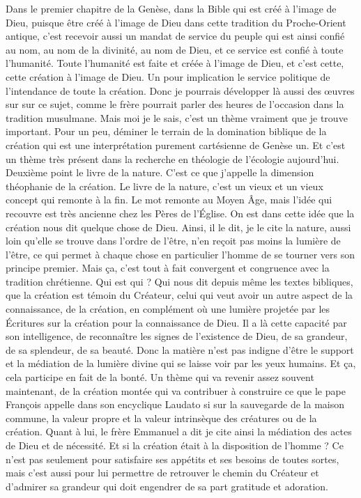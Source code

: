 Dans le premier chapitre de la Genèse, dans la Bible qui est créé à l'image de Dieu, puisque être créé à l'image de Dieu dans cette tradition du Proche-Orient antique, c'est recevoir aussi un mandat de service du peuple qui est ainsi confié au nom, au nom de la divinité, au nom de Dieu, et ce service est confié à toute l'humanité.
Toute l'humanité est faite et créée à l'image de Dieu, et c'est cette, cette création à l'image de Dieu. Un pour implication le service politique de l'intendance de toute la création. Donc je pourrais développer là aussi des œuvres sur sur ce sujet, comme le frère pourrait parler des heures de l'occasion dans la tradition musulmane. Mais moi je le sais, c'est un thème vraiment que je trouve important.
Pour un peu, déminer le terrain de la domination biblique de la création qui est une interprétation purement cartésienne de Genèse un. Et c'est un thème très présent dans la recherche en théologie de l'écologie aujourd'hui. Deuxième point le livre de la nature. C'est ce que j'appelle la dimension théophanie de la création. Le livre de la nature, c'est un vieux et un vieux concept qui remonte à la fin.
Le mot remonte au Moyen Âge, mais l'idée qui recouvre est très ancienne chez les Pères de l'Église. On est dans cette idée que la création nous dit quelque chose de Dieu. Ainsi, il le dit, je le cite la nature, aussi loin qu'elle se trouve dans l'ordre de l'être, n'en reçoit pas moins la lumière de l'être, ce qui permet à chaque chose en particulier l'homme de se tourner vers son principe premier.
Mais ça, c'est tout à fait convergent et congruence avec la tradition chrétienne. Qui est qui ? Qui nous dit depuis même les textes bibliques, que la création est témoin du Créateur, celui qui veut avoir un autre aspect de la connaissance, de la création, en complément où une lumière projetée par les Écritures sur la création pour la connaissance de Dieu.
Il a là cette capacité par son intelligence, de reconnaître les signes de l'existence de Dieu, de sa grandeur, de sa splendeur, de sa beauté. Donc la matière n'est pas indigne d'être le support et la médiation de la lumière divine qui se laisse voir par les yeux humains. Et ça, cela participe en fait de la bonté. Un thème qui va revenir assez souvent maintenant, de la création montée qui va contribuer à construire ce que le pape François appelle dans son encyclique Laudato si sur la sauvegarde de la maison commune, la valeur propre et la valeur intrinsèque des créatures ou de la création.
Quant à lui, le frère Emmanuel a dit je cite ainsi la médiation des actes de Dieu et de nécessité. Et si la création était à la disposition de l'homme ? Ce n'est pas seulement pour satisfaire ses appétits et ses besoins de toutes sortes, mais c'est aussi pour lui permettre de retrouver le chemin du Créateur et d'admirer sa grandeur qui doit engendrer de sa part gratitude et adoration.
